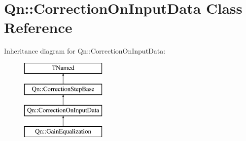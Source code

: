 \hypertarget{classQn_1_1CorrectionOnInputData}{}\section{Qn\+:\+:Correction\+On\+Input\+Data Class Reference}
\label{classQn_1_1CorrectionOnInputData}
Inheritance diagram for Qn\+:\+:Correction\+On\+Input\+Data\+:\begin{figure}[H]
\begin{center}
\leavevmode
\includegraphics[height=4.000000cm]{classQn_1_1CorrectionOnInputData}
\end{center}
\end{figure}
